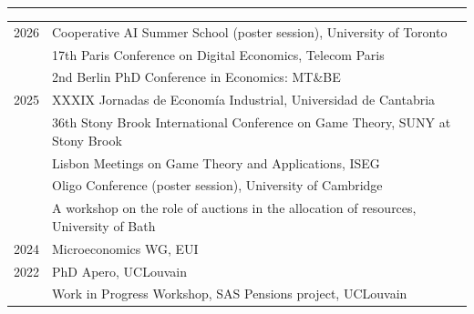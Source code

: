 \hrule %
\setcounter{footnote}{0}
\renewcommand{\thefootnote}{\fnsymbol{footnote}}
\vspace{2mm}

\begin{longtable}[l]{@{}p{} p{}}
    2026 & Cooperative AI Summer School (poster session), University of Toronto\\
    & 17th Paris Conference on Digital Economics, Telecom Paris \\ 
    & 2nd Berlin PhD Conference in Economics: MT\&BE \\[5pt]
    2025 & XXXIX Jornadas de Economía Industrial, Universidad de Cantabria \\
    & 36th Stony Brook International Conference on Game Theory, SUNY at Stony Brook \\
    & Lisbon Meetings on Game Theory and Applications, ISEG \\
    & Oligo Conference (poster session), University of Cambridge \\
    & A workshop on the role of auctions in the allocation of resources, University of Bath \\[5pt]
    2024 & Microeconomics WG, EUI \\[5pt]
    2022 & PhD Apero, UCLouvain \\
    & Work in Progress Workshop, SAS Pensions project, UCLouvain \\[5pt]
\end{longtable}
\vspace{-2mm}


